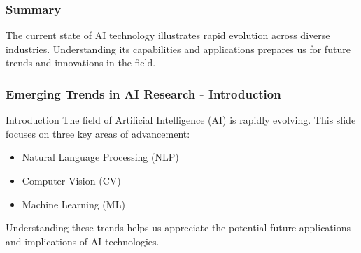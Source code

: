 \documentclass{beamer}
\begin{document}
\begin{frame}[fragile]
    \frametitle{Summary}
    The current state of AI technology illustrates rapid evolution across diverse industries. Understanding its capabilities and applications prepares us for future trends and innovations in the field.
\end{frame}

\begin{frame}[fragile]
    \frametitle{Emerging Trends in AI Research - Introduction}
    \begin{block}{Introduction}
        The field of Artificial Intelligence (AI) is rapidly evolving. This slide focuses on three key areas of advancement:
        \begin{itemize}
            \item Natural Language Processing (NLP)
            \item Computer Vision (CV)
            \item Machine Learning (ML)
        \end{itemize}
        Understanding these trends helps us appreciate the potential future applications and implications of AI technologies.
    \end{block}
\end{frame}
\end{document}
